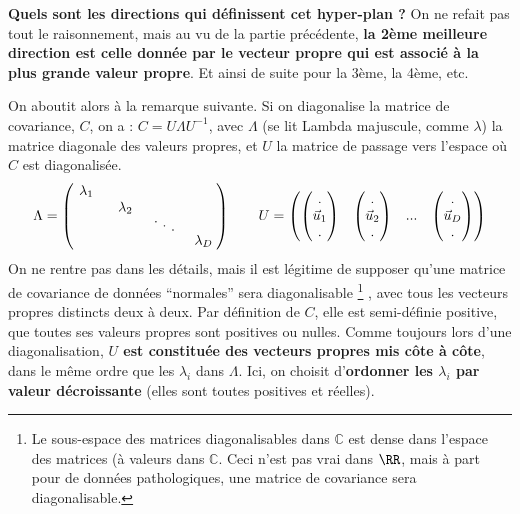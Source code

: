 \documentclass[french,twoside]{article}
\newcommand{\cad}{\text{c'est-à-dire} }
\newcommand{\diagentry}[1]{\mathmakebox[1.8em]{#1}}
\newcommand{\xddots}{%
  \raise 4pt \hbox {.}
  \mkern 6mu
  \raise 1pt \hbox {.}
  \mkern 6mu
  \raise -2pt \hbox {.}
}
\begin{document}
\textbf{Quels sont les directions qui définissent cet hyper-plan ?}
On ne refait pas tout le raisonnement, mais au vu de la partie précédente, \textbf{la 2ème meilleure direction est celle donnée par le vecteur propre qui est associé à la plus grande valeur propre}.
Et ainsi de suite pour la 3ème, la 4ème, etc.

On aboutit alors à la remarque suivante.
Si on diagonalise la matrice de covariance, $C$, on a : $C =U \Lambda U^{-1}$, avec $\Lambda$ (se lit Lambda majuscule, comme $\lambda$) la matrice diagonale des valeurs propres, et $U$ la matrice de passage vers l'espace où $C$ est diagonalisée.
\begin{align}
\Lambda = \begin{pmatrix}
    \diagentry{\lambda_1}\\
    &\diagentry{\lambda_2}\\
    &&\diagentry{\xddots}\\
    &&&\diagentry{\lambda_{D}}\\
\end{pmatrix}
\qquad
U = \begin{pmatrix}  \begin{pmatrix} . \\ \vec u_1 \\  .  \end{pmatrix} &  \begin{pmatrix} . \\ \vec u_2 \\  .  \end{pmatrix} & ... &  \begin{pmatrix} . \\ \vec u_D \\  .  \end{pmatrix} \end{pmatrix}
\end{align}
On ne rentre pas dans les détails, mais il est légitime de supposer qu'une matrice de covariance de données ``normales'' sera diagonalisable
\footnote{Le sous-espace des matrices diagonalisables dans $\mathbb{C}$ est dense dans l'espace des matrices (à valeurs dans $\mathbb{C}$. Ceci n'est pas vrai dans $\RR$, mais à part pour de données pathologiques, une matrice de covariance sera diagonalisable.}
, avec tous les vecteurs propres distincts deux à deux. Par définition de $C$, elle est semi-définie positive, \cad que toutes ses valeurs propres sont positives ou nulles.
Comme toujours lors d'une diagonalisation, \textbf{$U$ est constituée des vecteurs propres mis côte à côte}, dans le même ordre que les $\lambda_i$ dans $\Lambda$.
Ici, on choisit d'\textbf{ordonner les $\lambda_i$ par valeur décroissante} (elles sont toutes positives et réelles).
\end{document}
